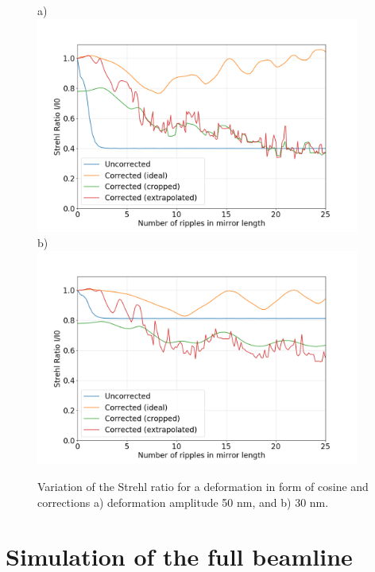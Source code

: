 \documentclass[preprint]{iucr}              %
\begin{document}
 
  \begin{figure}
  \label{fig:strehlRatioCosine} 
  \begin{flushleft}
  a)\\
  \includegraphics[width=0.95\textwidth]{figures/scan_peak_vs_cos50.png} \\
  b)\\
  \includegraphics[width=0.95\textwidth]{figures/scan_peak_vs_cos30.png} \\
  \end{flushleft}

  \caption
  {
Variation of the Strehl ratio for a deformation in form of cosine and corrections a) deformation amplitude 50 nm, and b) 30 nm.
}
  \end{figure} 
  
  


\section{Simulation of the full beamline}
\label{sec:2D}
\end{document}
